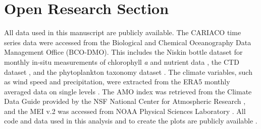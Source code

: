 \documentclass[]{agujournal2019}
\begin{document}
\newpage
%








%
%

\section*{Open Research Section}
All data used in this manuscript are publicly available. The CARIACO time 
series data were accessed from the Biological and Chemical Oceanography 
Data Management Office (BCO-DMO). This includes the Niskin bottle dataset 
for monthly in-situ measurements of chlorophyll \textit{a} and nutrient 
data \cite{muller-karger_time-series_2019}, the CTD dataset 
\cite{muller-karger_time_2019}, and the phytoplankton taxonomy dataset 
\cite{troccoli_time-series_2019}. The climate variables, such as wind 
speed and precipitation, were extracted from the ERA5 monthly averaged 
data on single levels \cite{hersbach_era5_2023}. The AMO index was 
retrieved from the Climate Data Guide provided by the NSF National Center 
for Atmospheric Research \cite{trenberth_climate_2023}, and the MEI v.2 
was accessed from NOAA Physical Sciences Laboratory 
\cite{noaa_physical_sciences_laboratory_multivariate_2025}. All code and 
data used in this analysis and to create the plots are publicly available  \cite{benjamin_post_2026_18942210}.
\end{document}
